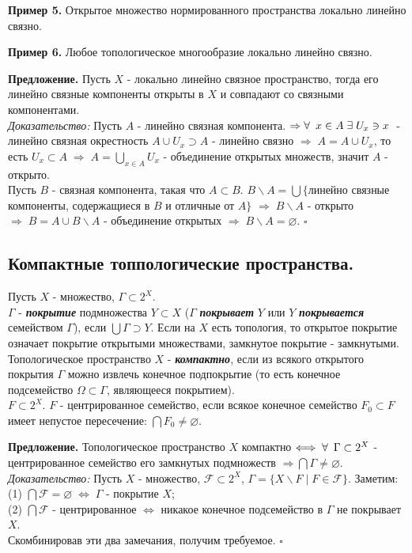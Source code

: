 \documentclass[../../main.tex]{subfiles}
\begin{document}
\textbf{Пример 5.} Открытое множество нормированного пространства локально линейно связно.

\textbf{Пример 6.} Любое топологическое многообразие локально линейно связно.

\textbf{Предложение.} Пусть $X$ - локально линейно связное пространство, тогда его линейно связные компоненты открыты в $X$ и совпадают со связными компонентами.\\
\textit{Доказательство:}
Пусть $A$ - линейно связная компонента. $\Rightarrow \forall\:\; x\in A\; \exists\; U_x \ni x\;$ - линейно связная окрестность $A\cup U_x \supset A$ - линейно связно $\Rightarrow\; A = A\cup U_x $, то есть $U_x\subset A\; \Rightarrow\; A = \bigcup\limits_{x\in A} U_x$ - объединение открытых множеств, значит $A$ - открыто.\\
Пусть $B$ - связная компонента, такая что $A\subset B$. $B\backslash A = \bigcup \{$линейно связные компоненты, содержащиеся в $B$ и отличные от  $A\}$ $\Rightarrow\; B\backslash A$ - открыто $\Rightarrow\; B = A\cup B\backslash A$ - объединение открытых $\Rightarrow\; B\backslash A = \varnothing$. $\square$

\subsection{Компактные топпологические пространства.}

Пусть $X$ - множество, $\Gamma\subset 2^X$.\\
 $\Gamma$ - \textbf{\textit{покрытие}} подмножества $Y\subset X$ ($\Gamma$ \textbf{\textit{покрывает}} $Y$ или $Y$ \textbf{\textit{покрывается}} семейством $\Gamma$), если $\bigcup\Gamma\supset Y$. Если на $X$ есть топология, то открытое покрытие означает покрытие открытыми множествами, замкнутое покрытие - замкнутыми.\\
 Топологическое пространство $X$ - \textbf{\textit{компактно}}, если из всякого открытого покрытия $\Gamma$ можно извлечь конечное подпокрытие (то есть конечное подсемейство $\Omega\subset\Gamma$, являющееся покрытием).\\
 $F\subset 2^X$. $F$ - центрированное семейство, если всякое конечное семейство $F_0\subset F$ имеет непустое пересечение: $\bigcap F_0 \neq \varnothing$.

\textbf{Предложение.} Топологическое пространство $X$ компактно $\Longleftrightarrow\; \forall\: \; \Gamma\subset 2^X $ - центрированное семейство его замкнутых подмножеств $\Rightarrow \bigcap \Gamma \neq \varnothing$.\\
\textit{Доказательство:}
Пусть $X$ - множество, $\mathcal F\subset 2^X$, $\Gamma = \{X\backslash F\; |\; F\in\mathcal F\}$. Заметим:\\
(1) $\bigcap \mathcal{F} = \varnothing\; \Leftrightarrow\; \Gamma$ - покрытие $X$;\\
(2) $\bigcap \mathcal{F}$ - центрированное $\Leftrightarrow$ никакое конечное подсемейство в $\Gamma$ не покрывает $X$.\\
Скомбинировав эти два замечания, получим требуемое. $\square$
\end{document}

